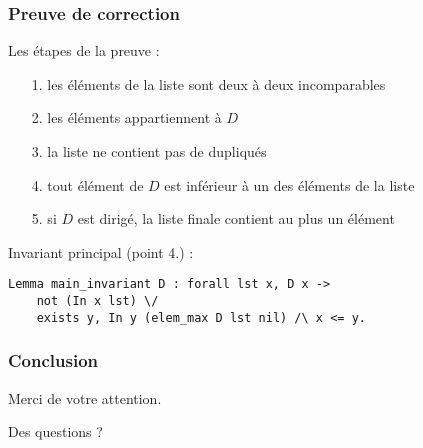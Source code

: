 \documentclass{beamer}
\begin{document}
\begin{frame}
{\begin{figure}[ht]
{
	}
\end{figure}
}

   
\end{frame}

\begin{frame}[fragile]
\frametitle{Preuve de correction}

Les étapes de la preuve :

\begin{itemize}
\item[1.] les éléments de la liste sont deux à deux incomparables
\item[2.] les éléments appartiennent à $D$
\item[3.] la liste ne contient pas de dupliqués
\item[4.] tout élément de $D$ est inférieur à un des éléments de la liste 
\item[5.] si $D$ est dirigé, la liste finale contient au plus un élément
\end{itemize}

\bigskip

Invariant principal (point 4.) :

\begin{lstlisting}[frame=single, language = Coq, basicstyle=\scriptsize]
Lemma main_invariant D : forall lst x, D x -> 
	not (In x lst) \/ 
	exists y, In y (elem_max D lst nil) /\ x <= y.
\end{lstlisting}

\end{frame}



\begin{frame}
\frametitle{Conclusion}


\centering
Merci de votre attention.

\bigskip

Des questions ?

\end{frame}
\end{document}
